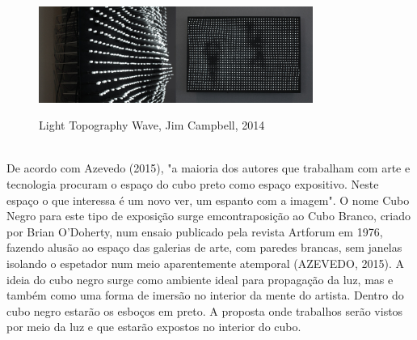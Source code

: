 \begin{figure}[H]
    \centering
    \caption{Light Topography Wave, Jim Campbell, 2014}
	\vspace*{0,2cm}
    \includegraphics[width=0.8\textwidth]{./04-figuras/jim_campbell}
    \label{fig:jim_campbell}
\end{figure}
\vspace*{-0,9cm}
{\raggedright {}}\\

De acordo com Azevedo (2015), "a maioria dos autores que trabalham com arte e tecnologia procuram o espaço do cubo preto como espaço expositivo. Neste espaço o que interessa é um novo ver, um espanto com a imagem". O nome Cubo Negro para este tipo de exposição surge emcontraposição ao Cubo Branco, criado por Brian O'Doherty, num ensaio publicado pela revista Artforum em 1976, fazendo alusão ao espaço das galerias de arte, com paredes brancas, sem janelas isolando o espetador num meio aparentemente atemporal (AZEVEDO, 2015). A ideia do cubo negro surge como ambiente ideal para propagação da luz, mas e também como uma forma de imersão no interior da mente do artista. Dentro do cubo negro estarão os esboços em preto. A proposta onde trabalhos serão vistos por meio da luz e que estarão expostos no interior do cubo.

